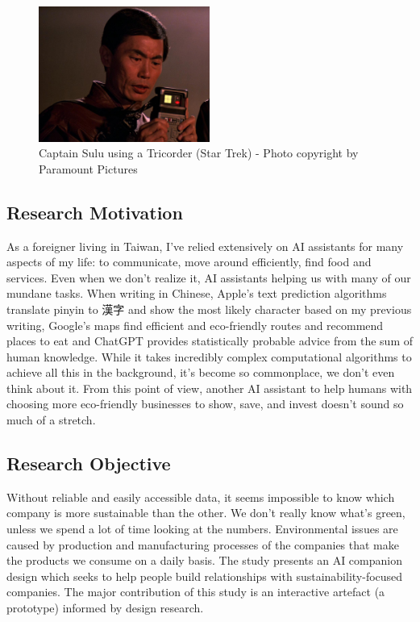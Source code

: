 \documentclass[
  letterpaper,
  DIV=11,
  numbers=noendperiod]{scrartcl}
\begin{document}
\begin{figure}[H]

{\centering \includegraphics[width=0.5\textwidth,height=\textheight]{./images/tricorder.jpg}

}

\caption{Captain Sulu using a Tricorder (Star Trek) - Photo copyright by
Paramount Pictures}

\end{figure}%

\subsection{Research Motivation}\label{research-motivation}

As a foreigner living in Taiwan, I've relied extensively on AI
assistants for many aspects of my life: to communicate, move around
efficiently, find food and services. Even when we don't realize it, AI
assistants helping us with many of our mundane tasks. When writing in
Chinese, Apple's text prediction algorithms translate pinyin to 漢字 and
show the most likely character based on my previous writing, Google's
maps find efficient and eco-friendly routes and recommend places to eat
and ChatGPT provides statistically probable advice from the sum of human
knowledge. While it takes incredibly complex computational algorithms to
achieve all this in the background, it's become so commonplace, we don't
even think about it. From this point of view, another AI assistant to
help humans with choosing more eco-friendly businesses to show, save,
and invest doesn't sound so much of a stretch.

\subsection{Research Objective}\label{research-objective}

Without reliable and easily accessible data, it seems impossible to know
which company is more sustainable than the other. We don't really know
what's green, unless we spend a lot of time looking at the numbers.
Environmental issues are caused by production and manufacturing
processes of the companies that make the products we consume on a daily
basis. The study presents an AI companion design which seeks to help
people build relationships with sustainability-focused companies. The
major contribution of this study is an interactive artefact (a
prototype) informed by design research.
\end{document}
